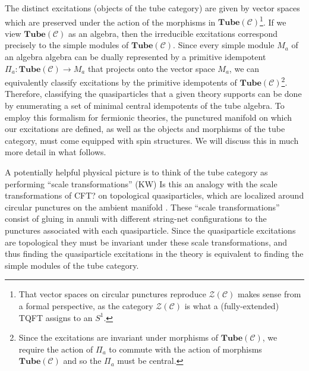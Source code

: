 \documentclass[12pt,a4paper]{article}
\newcounter{arrow}
\newcommand{\ra}{\rightarrow}
\newcommand{\mcz}{\mathcal{Z}}
\newcommand{\mcc}{\mathcal{C}}
\newcommand{\tube}{\textbf{Tube}}
\newcommand{\kw}[1]{{\color{kwcolor}\footnotesize{(KW) #1}}}
\begin{document}

The distinct excitations (objects of the tube category) are given by vector spaces which are preserved 
under the action of the morphisms in $\tube(\mcc)$\footnote{That vector spaces on circular punctures 
reproduce $\mcz(\mcc)$ makes sense from a formal perspective, as the category $\mcz(\mcc)$ is what a 
(fully-extended) TQFT assigns to an $S^1$.}. 
If we view $\tube(\mcc)$ as an algebra, then the irreducible excitations correspond precisely to the 
simple modules of $\tube(\mcc)$.
Since every simple module $M_a$ of an algebra algebra can be dually represented by a primitive idempotent 
$\Pi_a : \tube(\mcc) \ra M_a$ that projects onto the vector space $M_a$, we can equivalently classify 
excitations by the primitive idempotents of $\tube(\mcc)$\footnote{Since the excitations are invariant 
under morphisms of $\tube(\mcc)$, we require the action of $\Pi_a$ to commute with the action of 
morphisms $\tube(\mcc)$ and so the $\Pi_a$ must be central.}. 
Therefore, classifying the quasiparticles that a given theory supports can be done by enumerating a 
set of minimal central idempotents of the tube algebra. 
To employ this formalism for fermionic theories, the punctured manifold on which our excitations are defined, 
as well as the objects and morphisms of the tube category, must come equipped with spin structures. 
We will discuss this in much more detail in what follows. 

A potentially helpful physical picture is to think of the tube category as performing ``scale transformations'' 
\kw{Is this an analogy with the scale transformations of CFT?}
on topological quasiparticles, which are localized around circular punctures on the ambient manifold \cite{lan2014}. 
These ``scale transformations'' consist of gluing in annuli with different string-net configurations to the 
punctures associated with each quasiparticle. 
Since the quasiparticle excitations are topological they must be invariant under these scale transformations, 
and thus finding the quasiparticle excitations in the theory is equivalent to finding the simple 
modules of the tube category. 
\end{document}
